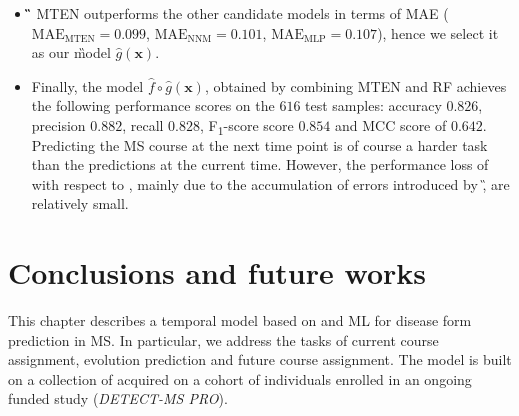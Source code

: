 \begin{itemize}
	
	
	\item[] \textbf{\G}
	MTEN outperforms the other candidate models in terms of MAE ($\text{MAE}_{\text{MTEN}}=0.099$, $\text{MAE}_{\text{NNM}}=0.101$, $\text{MAE}_{\text{MLP}}=0.107$), hence we select it as our \G model $\hat{g}(\bm{x})$.
	
	\item[] \textbf{\FOG}
	Finally, the \FOG model $\hat{f} \circ \hat{g}(\bm{x})$, obtained by combining MTEN and RF achieves the following performance scores on the $616$ test samples: accuracy $0.826$, precision $0.882$, recall $0.828$, F\textsubscript{$1$}-score score $0.854$ and MCC score of $0.642$. Predicting the MS course at the next time point is of course a harder task than the predictions at the current time. However, the performance loss of \FOG with respect to \F, mainly due to the accumulation of errors introduced by \G, are relatively small.
	
	
\end{itemize}






\section{Conclusions and future works}

This chapter describes a temporal model based on \PCOs and ML for disease form prediction in MS.
In particular, we address the tasks of current course assignment, \PCOs evolution prediction and future course assignment. The model is built on a collection of \PCOs acquired on a cohort of individuals enrolled in an ongoing funded study (\textit{DETECT-MS PRO}).

